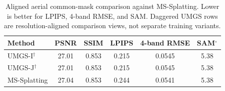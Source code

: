 \begin{table}[!t]
    \caption{Aligned aerial common-mask comparison against MS-Splatting. Lower is better for LPIPS, 4-band RMSE, and SAM. Daggered UMGS rows are resolution-aligned comparison views, not separate training variants.}
    \label{tab:mms-official-uav3}
    \centering
    \small
    \begin{tabular}{lccccc}
        \toprule
        Method & PSNR & SSIM & LPIPS & 4-band RMSE & SAM$^\circ$ \\
        \midrule
        UMGS-I$^\dagger$ & 27.01 & 0.853 & 0.215 & 0.0545 & 5.38 \\
        UMGS-J$^\dagger$ & 27.01 & 0.853 & 0.215 & 0.0545 & 5.38 \\
        MS-Splatting & 27.04 & 0.853 & 0.244 & 0.0541 & 5.38 \\
        \bottomrule
    \end{tabular}
\end{table}
